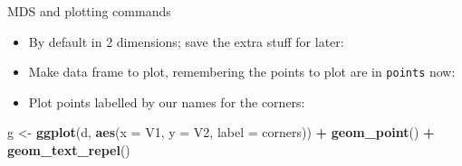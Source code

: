 \documentclass[ignorenonframetext,]{beamer}
\newenvironment{Shaded}{\begin{snugshade}}{\end{snugshade}}
\newcommand{\DataTypeTok}[1]{\textcolor[rgb]{0.13,0.29,0.53}{#1}}
\newcommand{\FloatTok}[1]{\textcolor[rgb]{0.00,0.00,0.81}{#1}}
\newcommand{\KeywordTok}[1]{\textcolor[rgb]{0.13,0.29,0.53}{\textbf{#1}}}
\newcommand{\NormalTok}[1]{#1}
\newcommand{\OperatorTok}[1]{\textcolor[rgb]{0.81,0.36,0.00}{\textbf{#1}}}
\newcommand{\StringTok}[1]{\textcolor[rgb]{0.31,0.60,0.02}{#1}}
\providecommand{\tightlist}{%
  \setlength{\itemsep}{0pt}\setlength{\parskip}{0pt}}
\begin{document}
\begin{frame}[fragile]{MDS and plotting commands}
\protect\hypertarget{mds-and-plotting-commands}{}

\begin{itemize}
\tightlist
\item
  By default in 2 dimensions; save the extra stuff for later:
\end{itemize}

\begin{Shaded}
\end{Shaded}

\begin{itemize}
\tightlist
\item
  Make data frame to plot, remembering the points to plot are in
  \texttt{points} now:
\end{itemize}

\begin{Shaded}
\end{Shaded}

\begin{itemize}
\tightlist
\item
  Plot points labelled by our names for the corners:
\end{itemize}

\begin{Shaded}
\begin{Highlighting}[]
\NormalTok{g <-}\StringTok{ }\KeywordTok{ggplot}\NormalTok{(d, }\KeywordTok{aes}\NormalTok{(}\DataTypeTok{x =}\NormalTok{ V1, }\DataTypeTok{y =}\NormalTok{ V2, }\DataTypeTok{label =}\NormalTok{ corners)) }\OperatorTok{+}
\StringTok{  }\KeywordTok{geom_point}\NormalTok{() }\OperatorTok{+}\StringTok{ }\KeywordTok{geom_text_repel}\NormalTok{()}
\end{Highlighting}
\end{Shaded}

\end{frame}
\end{document}
